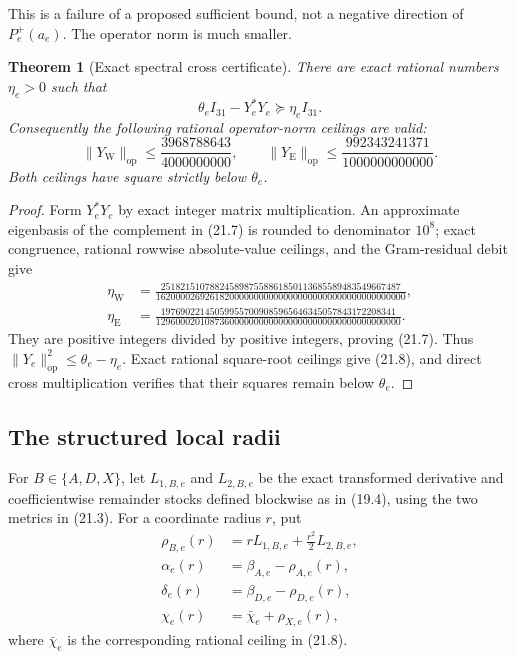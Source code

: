 \documentclass[11pt,oneside]{article}
\newtheorem{theorem}{Theorem}[section]
\theoremstyle{definition}
\theoremstyle{remark}
\begin{document}
This is a failure of a proposed sufficient bound, not a negative
direction of \(P_e^+(a_e)\).  The operator norm is much smaller.

\begin{theorem}[Exact spectral cross certificate]
\label{thm:newv21-cross}
There are exact rational numbers \(\eta_e>0\) such that
\[
 \theta_eI_{31}-Y_e^*Y_e\succeq\eta_eI_{31}.             \tag{21.7}
\]
Consequently the following rational operator-norm ceilings are
valid:
\[
 \|Y_{\mathrm W}\|_{\mathrm{op}}
 \le\frac{3968788643}{4000000000},\qquad
 \|Y_{\mathrm E}\|_{\mathrm{op}}
 \le\frac{992343241371}{1000000000000}.                  \tag{21.8}
\]
Both ceilings have square strictly below \(\theta_e\).
\end{theorem}

\begin{proof}
Form \(Y_e^*Y_e\) by exact integer matrix multiplication.  An
approximate eigenbasis of the complement in (21.7) is rounded to
denominator \(10^8\); exact congruence, rational rowwise
absolute-value ceilings, and the Gram-residual debit give
\[
\begin{aligned}
\eta_{\mathrm W}
&=\frac{
2518215107882458987558861850113685589483549667487}
{162000026926182000000000000000000000000000000000000},\\
\eta_{\mathrm E}
&=\frac{
197690221450599557009085965646345057843172208341}
{12960002010873600000000000000000000000000000000000}.
\end{aligned}                                            \tag{21.9}
\]
They are positive integers divided by positive integers, proving
(21.7).  Thus
\(\|Y_e\|_{\mathrm{op}}^2\le\theta_e-\eta_e\).
Exact rational square-root ceilings give (21.8), and direct
cross multiplication verifies that their squares remain below
\(\theta_e\).
\end{proof}

\subsection{The structured local radii}

For \(B\in\{A,D,X\}\), let \(L_{1,B,e}\) and \(L_{2,B,e}\) be the
exact transformed derivative and coefficientwise remainder stocks
defined blockwise as in (19.4), using the two metrics in (21.3).
For a coordinate radius \(r\), put
\[
\begin{aligned}
\rho_{B,e}(r)&=rL_{1,B,e}+\frac{r^2}{2}L_{2,B,e},\\
\alpha_e(r)&=\beta_{A,e}-\rho_{A,e}(r),\\
\delta_e(r)&=\beta_{D,e}-\rho_{D,e}(r),\\
\chi_e(r)&=\bar\chi_e+\rho_{X,e}(r),
\end{aligned}                                            \tag{21.10}
\]
where \(\bar\chi_e\) is the corresponding rational ceiling in
(21.8).
\end{document}
